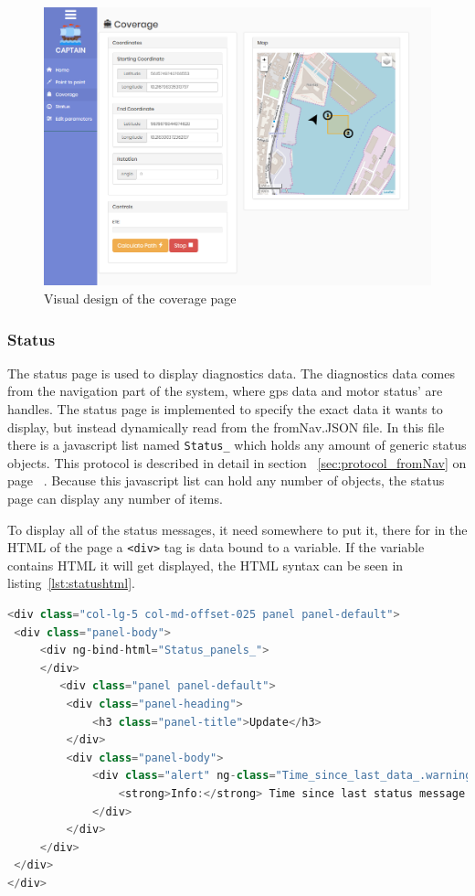 \begin{figure}[H]
\centering
\includegraphics[width=0.9\linewidth]{Images/Implementation/coverage_page}
\caption{Visual design of the coverage page}
\label{fig:coveragepage}
\end{figure}


\subsubsection{Status}
The status page is used to display diagnostics data. The diagnostics data comes from the navigation part of the system, where gps data and motor status' are handles. The status page is implemented to specify the exact data it wants to display, but instead dynamically read from the fromNav.JSON file. In this file there is a javascript list named \texttt{Status\_} which holds any amount of generic status objects. This protocol is described in detail in section ~\ref{sec:protocol_fromNav} on page ~\pageref{sec:protocol_fromNav}. Because this javascript list can hold any number of objects, the status page can display any number of items. 

To display all of the status messages, it need somewhere to put it, there for in the HTML of the page a \texttt{<div>} tag is data bound to a variable. If the variable contains HTML it will get displayed, the HTML syntax can be seen in listing~\ref{lst:statushtml}.

\begin{lstlisting}[caption = {Html for displaying status'}, captionpos=b, label={lst:statushtml}, language=C++,firstnumber=1]
<div class="col-lg-5 col-md-offset-025 panel panel-default">
 <div class="panel-body">
     <div ng-bind-html="Status_panels_">
     </div>
		<div class="panel panel-default">
         <div class="panel-heading">
             <h3 class="panel-title">Update</h3>
         </div>
         <div class="panel-body">
             <div class="alert" ng-class="Time_since_last_data_.warning_" style=" display:inline-block; padding-top=1em">
                 <strong>Info:</strong> Time since last status message: {{Time_since_last_data_.time_}} s<br />
             </div>
         </div>
     </div>
 </div>
</div>
\end{lstlisting}

